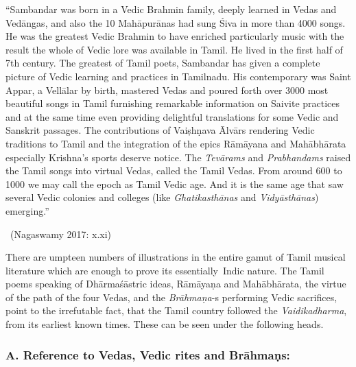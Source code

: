 \begin{myquote}
“Sambandar was born in a Vedic Brahmin family, deeply learned in Vedas and Vedāngas, and also the 10 Mahāpurānas had sung Śiva in more than 4000 songs. He was the greatest Vedic Brahmin to have enriched particularly music with the result the whole of Vedic lore was available in Tamil. He lived in the first half of 7th century. The greatest of Tamil poets, Sambandar has given a complete picture of Vedic learning and practices in Tamilnadu. His contemporary was Saint Appar, a Vellālar by birth, mastered Vedas and poured forth over 3000 most beautiful songs in Tamil furnishing remarkable information on Saivite practices and at the same time even providing delightful translations for some Vedic and Sanskrit passages. The contributions of Vaiṣhṇava Ālvārs rendering Vedic traditions to Tamil and the integration of the epics Rāmāyana and Mahābhārata especially Krishna’s sports deserve notice. The \textit{Tevārams} and \textit{Prabhandams} raised the Tamil songs into virtual Vedas, called the Tamil Vedas. From around 600 to 1000 we may call the epoch as Tamil Vedic age. And it is the same age that saw several Vedic colonies and colleges (like \textit{Ghatikasthānas} and \textit{Vidyāsthānas}) emerging.”

~\hfill (Nagaswamy 2017: x.xi)
\end{myquote}

There are umpteen numbers of illustrations in the entire gamut of Tamil musical literature which are enough to prove its essentially~Indic nature. The Tamil poems speaking of Dhārmaśāstric ideas, Rāmāyaṇa and Mahābhārata, the virtue of the path of the four Vedas, and the \textit{Brāhmaṇa}-s performing Vedic sacrifices, point to the irrefutable fact, that the Tamil country followed the \textit{Vaidikadharma}, from its earliest known times. These can be seen under the following heads.

\subsubsection*{A. Reference to Vedas, Vedic rites and Brāhmaṇs:}

